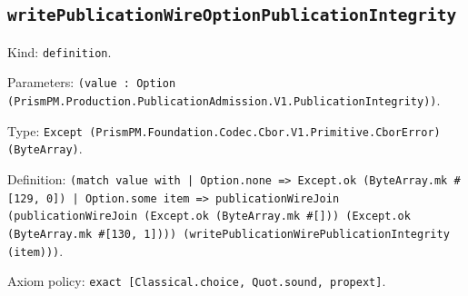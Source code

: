 \documentclass[11pt]{article}
\begin{document}
\subsection*{\texttt{writePublicationWireOptionPublicationIntegrity}}
\noindent Kind: \texttt{definition}.\par
\noindent Parameters: \texttt{(value : Option (PrismPM.Production.PublicationAdmission.V1.PublicationIntegrity))}.\par
\noindent Type: \texttt{Except (PrismPM.Foundation.Codec.Cbor.V1.Primitive.CborError) (ByteArray)}.\par
\noindent Definition: \texttt{(match value with | Option.none => Except.ok (ByteArray.mk \#[129, 0]) | Option.some item => publicationWireJoin (publicationWireJoin (Except.ok (ByteArray.mk \#[])) (Except.ok (ByteArray.mk \#[130, 1]))) (writePublicationWirePublicationIntegrity (item)))}.\par
\noindent Axiom policy: \texttt{exact [Classical.choice, Quot.sound, propext]}.\par
\end{document}
